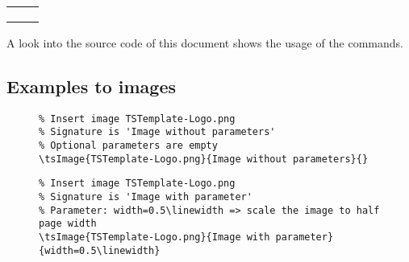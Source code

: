 \begin{footnotesize}
\begin{longtable}{ | P{0.53\linewidth} | p{0.4\linewidth} | }
        \hline
                                                &
                                                                                   \\
        \hline
                                                    &
                                                                                       \\
        \hline
                                                        &
                                                                                           \\
        \hline
    \end{longtable}
\end{footnotesize}

A look into the source code of this document shows the usage of the commands.

\subsection{Examples to images}

\begin{figure}[H]
    \small
    \centering
    \begin{BVerbatim}
\tsImage{TSTemplate-Logo.png}{Image without parameters}{}
    \end{BVerbatim}
\end{figure}


\begin{figure}[H]
    \small
    \centering
    \begin{BVerbatim}
\tsImage{TSTemplate-Logo.png}{Image with parameter}{width=0.5\linewidth}
    \end{BVerbatim}
\end{figure}

